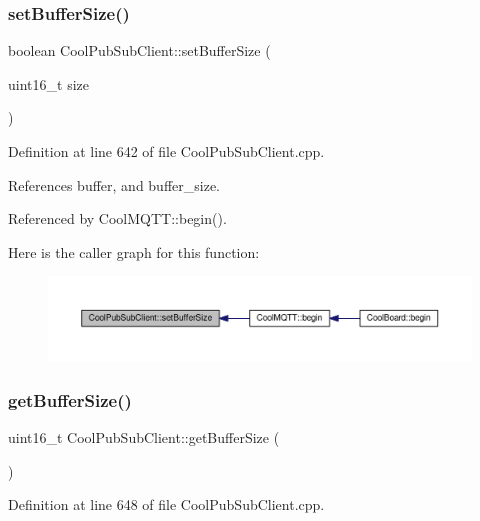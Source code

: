 \subsubsection{\texorpdfstring{set\+Buffer\+Size()}{setBufferSize()}}
{\footnotesize\ttfamily boolean Cool\+Pub\+Sub\+Client\+::set\+Buffer\+Size (\begin{DoxyParamCaption}\item[{uint16\+\_\+t}]{size }\end{DoxyParamCaption})}



Definition at line 642 of file Cool\+Pub\+Sub\+Client.\+cpp.



References buffer, and buffer\+\_\+size.



Referenced by Cool\+M\+Q\+T\+T\+::begin().

Here is the caller graph for this function\+:
\nopagebreak
\begin{figure}[H]
\begin{center}
\leavevmode
\includegraphics[width=350pt]{d8/d4b/class_cool_pub_sub_client_a4f83e54f1ba96e32f725d93cdec283b7_icgraph}
\end{center}
\end{figure}
\mbox{\label{class_cool_pub_sub_client_ac3c8bf1daed573d1ffa8b5c1fcb13f98}} 
\subsubsection{\texorpdfstring{get\+Buffer\+Size()}{getBufferSize()}}
{\footnotesize\ttfamily uint16\+\_\+t Cool\+Pub\+Sub\+Client\+::get\+Buffer\+Size (\begin{DoxyParamCaption}{ }\end{DoxyParamCaption})}



Definition at line 648 of file Cool\+Pub\+Sub\+Client.\+cpp.



